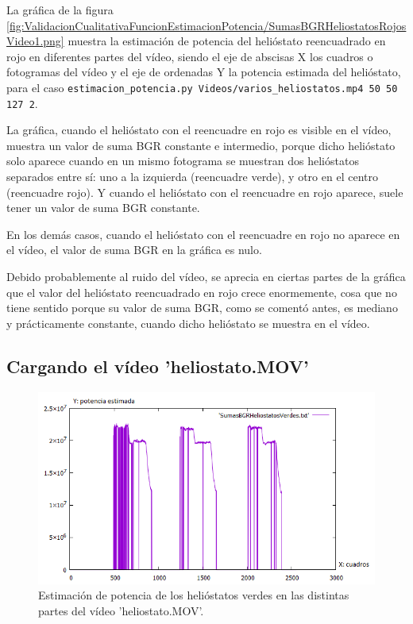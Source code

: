 La gráfica de la figura \ref{fig:ValidacionCualitativaFuncionEstimacionPotencia/SumasBGRHeliostatosRojosVideo1.png} muestra la estimación de potencia del helióstato reencuadrado en rojo en diferentes partes del vídeo, siendo el eje de abscisas X los cuadros o fotogramas del vídeo y el eje de ordenadas Y la potencia estimada del helióstato, para el caso \verb|estimacion_potencia.py Videos/varios_heliostatos.mp4 50 50 127 2|.

La gráfica, cuando el helióstato con el reencuadre en rojo es visible en el vídeo, muestra un valor de suma BGR constante e intermedio, porque dicho helióstato solo aparece cuando en un mismo fotograma se muestran dos helióstatos separados entre sí: uno a la izquierda (reencuadre verde), y otro en el centro (reencuadre rojo). Y cuando el helióstato con el reencuadre en rojo aparece, suele tener un valor de suma BGR constante.

En los demás casos, cuando el helióstato con el reencuadre en rojo no aparece en el vídeo, el valor de suma BGR en la gráfica es nulo.

Debido probablemente al ruido del vídeo, se aprecia en ciertas partes de la gráfica que el valor del helióstato reencuadrado en rojo crece enormemente, cosa que no tiene sentido porque su valor de suma BGR, como se comentó antes, es mediano y prácticamente constante, cuando dicho helióstato se muestra en el vídeo.

\subsection{Cargando el vídeo 'heliostato.MOV'}

\begin{figure}[h!]
  	\centering
	\includegraphics[width=\textwidth]{ValidacionCualitativaFuncionEstimacionPotencia/SumasBGRHeliostatosVerdesVideo2.png}
	\caption{Estimación de potencia de los helióstatos verdes en las distintas partes del vídeo 'heliostato.MOV'.
	\label{fig:ValidacionCualitativaFuncionEstimacionPotencia/SumasBGRHeliostatosVerdesVideo2.png}}
\end{figure}

